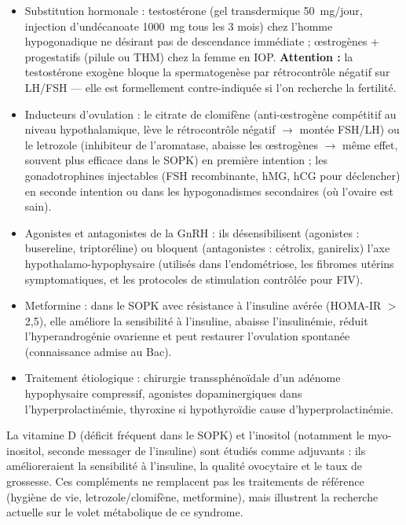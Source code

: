 \documentclass[11pt]{article}
\newcommand{\cle}[1]{{\popxbold\color{popdark}#1}}
\begin{document}
\begin{itemize}
\item \cle{Substitution hormonale} : testostérone (gel transdermique \SI{50}{mg}/jour, injection d'undécanoate \SI{1000}{mg} tous les 3 mois) chez l'homme hypogonadique ne désirant pas de descendance immédiate ; œstrogènes + progestatifs (pilule ou THM) chez la femme en IOP. \textbf{Attention :} la testostérone exogène bloque la spermatogenèse par rétrocontrôle négatif sur LH/FSH — elle est formellement contre-indiquée si l'on recherche la fertilité.
\item \cle{Inducteurs d'ovulation} : le \cle{citrate de clomifène} (anti-œstrogène compétitif au niveau hypothalamique, lève le rétrocontrôle négatif $\rightarrow$ montée FSH/LH) ou le \cle{letrozole} (inhibiteur de l'aromatase, abaisse les œstrogènes $\rightarrow$ même effet, souvent plus efficace dans le SOPK) en première intention ; les \cle{gonadotrophines} injectables (FSH recombinante, hMG, hCG pour déclencher) en seconde intention ou dans les hypogonadismes secondaires (où l'ovaire est sain).
\item \cle{Agonistes et antagonistes de la GnRH} : ils désensibilisent (agonistes : busereline, triptoréline) ou bloquent (antagonistes : cétrolix, ganirelix) l'axe hypothalamo-hypophysaire (utilisés dans l'endométriose, les fibromes utérins symptomatiques, et les protocoles de stimulation contrôlée pour FIV).
\item \cle{Metformine} : dans le SOPK avec résistance à l'insuline avérée (HOMA-IR $>$ 2,5), elle améliore la sensibilité à l'insuline, abaisse l'insulinémie, réduit l'hyperandrogénie ovarienne et peut restaurer l'ovulation spontanée (connaissance admise au Bac).
\item Traitement étiologique : chirurgie transsphénoïdale d'un adénome hypophysaire compressif, agonistes dopaminergiques dans l'hyperprolactinémie, thyroxine si hypothyroïdie cause d'hyperprolactinémie.
\end{itemize}

\begin{savaistu}
La \cle{vitamine D} (déficit fréquent dans le SOPK) et l'\cle{inositol} (notamment le myo-inositol, seconde messager de l'insuline) sont étudiés comme adjuvants : ils amélioreraient la sensibilité à l'insuline, la qualité ovocytaire et le taux de grossesse. Ces compléments ne remplacent pas les traitements de référence (hygiène de vie, letrozole/clomifène, metformine), mais illustrent la recherche actuelle sur le volet métabolique de ce syndrome.
\end{savaistu}
\end{document}

